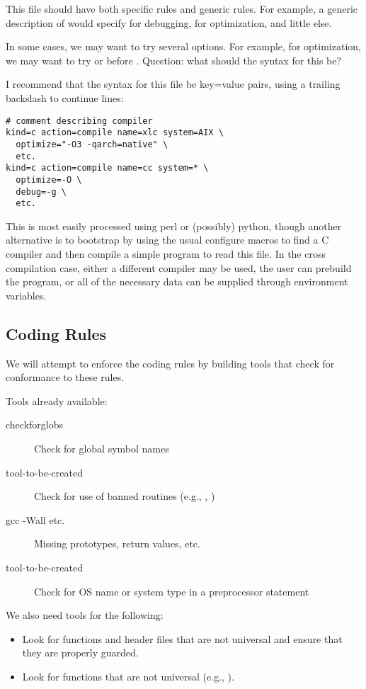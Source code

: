 \documentclass{article}
\begin{document}
This file should have both specific rules and generic rules.  For
example, a generic description of  would specify 
for debugging,  for optimization, and little else.  

In some cases, we may want to try several options.  For example, for
optimization, we may want to try  or  before .
Question:
what should the syntax for this be?

I recommend that the syntax for this file be key=value pairs, using a
trailing backslash to continue lines:
\begin{verbatim}
# comment describing compiler
kind=c action=compile name=xlc system=AIX \
  optimize="-O3 -qarch=native" \
  etc.
kind=c action=compile name=cc system=* \
  optimize=-O \
  debug=-g \
  etc.
\end{verbatim}
This is most easily processed using perl or (possibly) python, though
another alternative is to bootstrap by using the usual configure
macros to find a C compiler and then compile a simple program to read
this file.  In the cross compilation case, either a different compiler
may be used, the user can prebuild the program, or all of the
necessary data can be supplied through environment variables.

\subsection{Coding Rules}
We will attempt to enforce the coding rules by building tools that
check for conformance to these rules.

Tools already available:
\begin{description}
\item[checkforglobs]Check for global symbol names
\item[tool-to-be-created]Check for use of banned routines (e.g., ,
)
\item[gcc -Wall etc.]Missing prototypes, return values, etc.
\item[tool-to-be-created]Check for OS name or system type in a preprocessor
  statement 
\end{description}

We also need tools for the following:
\begin{itemize}
\item Look for functions and header files that are not universal and
ensure that they are properly guarded.
\item Look for functions that are not universal (e.g., ).
\end{itemize}
\end{document}

